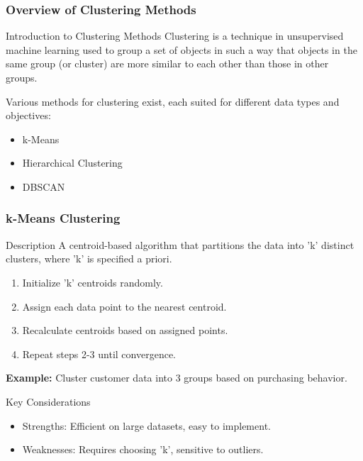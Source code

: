 \documentclass[aspectratio=169]{beamer}
\begin{document}
\begin{frame}[fragile]
    \frametitle{Overview of Clustering Methods}
    \begin{block}{Introduction to Clustering Methods}
        Clustering is a technique in unsupervised machine learning used to group a set of objects in such a way that objects in the same group (or cluster) are more similar to each other than those in other groups.
    \end{block}
    Various methods for clustering exist, each suited for different data types and objectives:
    \begin{itemize}
        \item k-Means
        \item Hierarchical Clustering
        \item DBSCAN
    \end{itemize}
\end{frame}

\begin{frame}[fragile]
    \frametitle{k-Means Clustering}
    \begin{block}{Description}
        A centroid-based algorithm that partitions the data into 'k' distinct clusters, where 'k' is specified a priori.
    \end{block}
    \begin{enumerate}
        \item Initialize 'k' centroids randomly.
        \item Assign each data point to the nearest centroid.
        \item Recalculate centroids based on assigned points.
        \item Repeat steps 2-3 until convergence.
    \end{enumerate}
    \textbf{Example:} Cluster customer data into 3 groups based on purchasing behavior.
    
    \begin{block}{Key Considerations}
        \begin{itemize}
            \item Strengths: Efficient on large datasets, easy to implement.
            \item Weaknesses: Requires choosing 'k', sensitive to outliers.
        \end{itemize}
    \end{block}
\end{frame}
\end{document}

